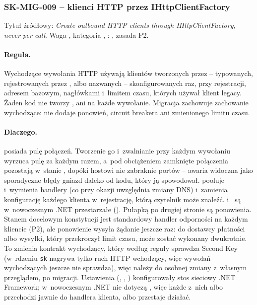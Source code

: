 \subsubsection{SK-MIG-009 -- klienci HTTP przez IHttpClientFactory}\label{sec:standardy-sk-mig-009}

Tytuł źródłowy: \emph{Create outbound HTTP clients through IHttpClientFactory, never per
call}. Waga , kategoria , :
, zasada P2.

\paragraph{Reguła.} Wychodzące wywołania HTTP używają klientów tworzonych przez
 -- typowanych, rejestrowanych przez
, albo nazwanych -- skonfigurowanych raz, przy rejestracji,
adresem bazowym, nagłówkami i~limitem czasu, których używał klient legacy. Żaden kod nie
tworzy ,  ani  na każde
wywołanie. Migracja zachowuje zachowanie wychodzące: nie dodaje ponowień, circuit breakera
ani zmienionego limitu czasu.

\paragraph{Dlaczego.}  posiada pulę połączeń. Tworzenie go i~zwalnianie
przy każdym wywołaniu wyrzuca pulę za każdym razem, a~pod obciążeniem zamknięte połączenia
pozostają w~stanie , dopóki hostowi nie zabraknie portów -- awaria
widoczna jako sporadyczne błędy gniazd daleko od kodu, który ją spowodował.
 pooluje i~wymienia handlery (co przy okazji uwzględnia zmiany
DNS) i~zamienia konfigurację każdego klienta w~rejestrację, którą czytelnik może znaleźć.
 i~ są w~nowoczesnym .NET przestarzałe
(). Pułapką po drugiej stronie są ponowienia. Stanem docelowym
konstytucji jest standardowy handler odporności na każdym kliencie (P2), ale ponowienie
wysyła żądanie jeszcze raz:  do dostawcy płatności albo wysyłki, który
przekroczył limit czasu, może zostać wykonany dwukrotnie. To zmienia kontrakt wychodzący,
który według reguły sprawdza Second Key (w~rdzeniu \texttt{sk} nagrywa tylko ruch HTTP
wchodzący, więc wywołań wychodzących jeszcze nie sprawdza), więc należy do osobnej zmiany
z~własnym przeglądem, po migracji.
Ustawienia  (,
, ) konfigurowały
stos sieciowy .NET Framework; w~nowoczesnym .NET nie dotyczą , więc
każde z~nich albo przechodzi jawnie do handlera klienta, albo przestaje działać.


